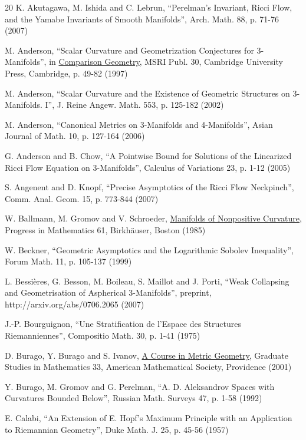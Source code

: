 \begin{thebibliography}{20}
 K. Akutagawa, M. Ishida and C. Lebrun,
``Perelman's Invariant, Ricci Flow, and the Yamabe Invariants of Smooth Manifolds'',
Arch. Math. 88, p. 71-76 (2007)

 M. Anderson,
``Scalar Curvature and Geometrization Conjectures for $3$-Manifolds'',
in \underline{Comparison Geometry}, MSRI Publ. 30,
Cambridge University Press, Cambridge, p. 49-82 (1997)

 M. Anderson,
``Scalar Curvature and the Existence of Geometric Structures on
$3$-Manifolds. I'', J. Reine Angew. Math. 553, p. 125-182 (2002)

 M. Anderson,
``Canonical Metrics on 3-Manifolds and 4-Manifolds'',
Asian Journal of Math. 10, p. 127-164 (2006)

 G. Anderson and B. Chow,
``A Pointwise Bound for Solutions of the Linearized Ricci Flow
Equation on 3-Manifolds'', Calculus of Variations 23, p. 1-12 (2005)

  S. Angenent and D. Knopf,
``Precise Asymptotics of the Ricci Flow
Neckpinch'', Comm. Anal. Geom. 15, p. 773-844 (2007)

W. Ballmann, M. Gromov and V. Schroeder,
\underline{Manifolds of Nonpositive Curvature},
Progress in Mathematics 61,
Birkh\"auser, Boston (1985)

W. Beckner,
``Geometric Asymptotics and the Logarithmic Sobolev Inequality'',
Forum Math. 11, p. 105-137 (1999)

 L. Bessi\`eres, G. Besson, M. Boileau, S. Maillot and
J. Porti, ``Weak Collapsing and Geometrisation of Aspherical 3-Manifolds'',
preprint, http://arxiv.org/abs/0706.2065 (2007)

 J.-P. Bourguignon, ``Une Stratification de l'Espace
des Structures Riemanniennes'',
Compositio Math. 30, p. 1-41 (1975)

D. Burago, Y. Burago and S. Ivanov,
\underline{A Course in Metric Geometry},
Graduate Studies in Mathematics 33,
American Mathematical Society, Providence (2001)

Y. Burago, M. Gromov and G. Perelman,
``A. D. Aleksandrov Spaces with Curvatures Bounded Below'',
Russian Math. Surveys 47, p. 1-58 (1992)

 E. Calabi,
``An Extension of E. Hopf's Maximum Principle with an Application to
Riemannian Geometry'',
Duke Math. J. 25, p. 45-56 (1957)


\end{thebibliography}
